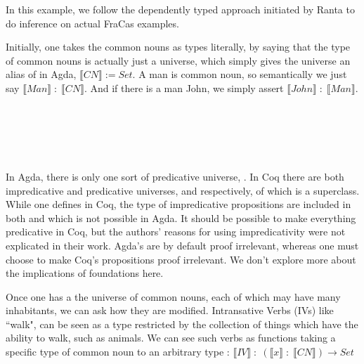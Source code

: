 In this example, we follow the dependently typed approach initiated by Ranta to
do inference on actual FraCas examples.

Initially, one takes the common nouns as types literally, by saying that the
type of common nouns is actually just a universe, which simply gives the
universe an alias of  in Agda, $\llbracket CN \rrbracket := Set$. A man
is common noun, so semantically we just say $\llbracket Man \rrbracket\; {:}\;
\llbracket CN \rrbracket$. And if there is a man John, we simply assert
$\llbracket John \rrbracket\; {:}\; \llbracket Man \rrbracket$.

\begin{code}%
\>[0]\AgdaSpace{}%
\AgdaSymbol{=}\AgdaSpace{}%
\<%
\\
%
\\[\AgdaEmptyExtraSkip]%
\>[0]\<%
\\
\>[0][@{}l@{\AgdaIndent{0}}]%
\>[2]\AgdaSpace{}%
\AgdaSymbol{:}\AgdaSpace{}%
\<%
\\
%
\>[2]\AgdaSpace{}%
\AgdaSymbol{:}\AgdaSpace{}%
\<%
\end{code}

In Agda, there is only one sort of predicative universe, . In Coq
there are both impredicative and predicative universes,  and
 respectively, of which  is a superclass. While one defines
 in Coq, the type of impredicative propositions are included in
both \cite{fracoq} and \cite{luoCoq} which is not possible in Agda. It should be
possible to make everything predicative in Coq, but the authors' reasons for
using impredicativity were not explicated in their work. Agda's  are
by default proof irrelevant, whereas one must choose to make Coq's propositions
proof irrelevant. We don't explore more about the implications of foundations
here.

Once one has a the universe of common nouns, each of which may have many
inhabitants, we can ask how they are modified. Intransative Verbs (IVs) like
``walk", can be seen as a type restricted by the collection of things which have
the ability to walk, such as animals. We can see such verbs as functions taking a
specific type of common noun to an arbitrary type : $\llbracket IV \rrbracket\;
{:}\; (\llbracket x \rrbracket\; {:}\; \llbracket CN \rrbracket) \rightarrow
Set$

